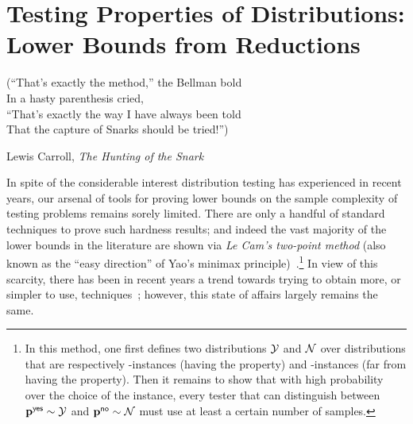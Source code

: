 \chapter{Testing Properties of Distributions: Lower Bounds from Reductions}\label{chap:unified:lb}

\epigraph{(``That's exactly the method,'' the Bellman bold\\
In a hasty parenthesis cried,\\
``That's exactly the way I have always been told\\
That the capture of Snarks should be tried!'')}{Lewis Carroll, \textit{The Hunting of the Snark}}


In spite of the considerable interest distribution testing has experienced in recent years, our arsenal of tools for proving lower bounds on the sample complexity of testing problems remains sorely limited. There are only a handful of standard techniques to prove such hardness results; and indeed the vast majority of the lower bounds in the literature are shown via \emph{Le Cam's two-point method} (also known as the ``easy direction'' of Yao's minimax principle)~\cite{Yu:97,Pollard:2003}.\footnote{In this method, one first defines two distributions $\cal Y$ and $\cal N$ over distributions that are respectively \yes-instances (having the property) and \no-instances (far from having the property). Then it remains to show that with high probability over the choice of the instance, every tester that can distinguish between $\mathbf{p}^{\textsf{yes}} \sim \cal Y$ and $\mathbf{p}^{\textsf{no}} \sim \cal N$ must use at least a certain number of samples.}{} In view of this scarcity, there has been in recent years a trend towards trying to obtain more, or simpler to use, techniques~\cite{Valiant:11,DK:16}; however, this state of affairs largely remains the same.

